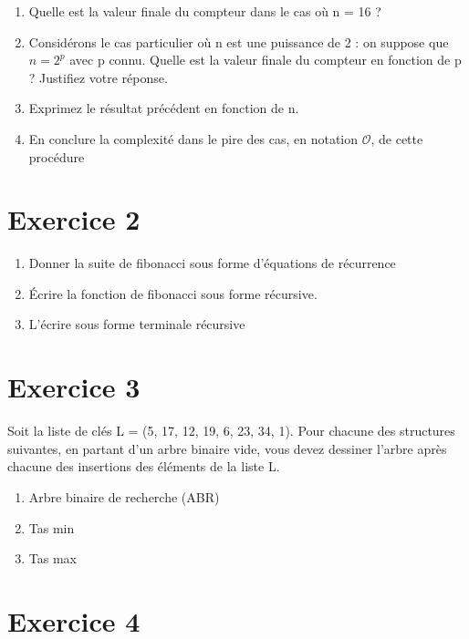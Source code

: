\documentclass{article}[12pt]
\begin{document}
\begin{enumerate}
    \item Quelle est la valeur finale du compteur dans le cas où n = 16 ?
    \item Considérons le cas particulier où n est une puissance de 2 : on suppose que $n = 2^p$ avec p connu.
Quelle est la valeur finale du compteur en fonction de p ? Justifiez votre réponse.
    \item Exprimez le résultat précédent en fonction de n.
    \item En conclure la complexité dans le pire des cas, en notation $\mathcal{O}$, de cette procédure
\end{enumerate}


\section*{Exercice 2}
\begin{enumerate}


    \item Donner la suite de fibonacci sous forme d'équations de récurrence
    
    \item Écrire la fonction de fibonacci sous forme récursive. 
    
    \item L'écrire sous forme terminale récursive
\end{enumerate}


\section*{Exercice 3}

Soit la liste de clés L = (5, 17, 12, 19, 6, 23, 34, 1). Pour chacune des structures suivantes, en partant d’un arbre binaire vide, vous devez dessiner l’arbre après chacune des insertions des éléments de la liste L.
    \begin{enumerate}
        \item Arbre binaire de recherche (ABR)
        \item Tas min
        \item Tas max
    \end{enumerate}

\section*{Exercice 4}
\end{document}

